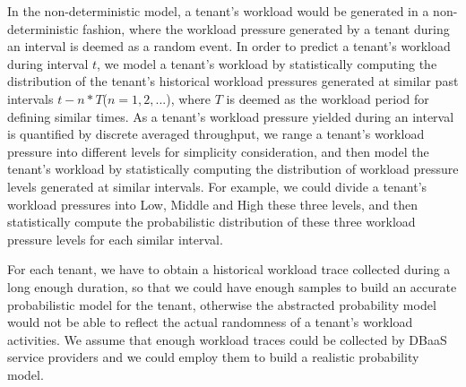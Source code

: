 In the non-deterministic model, a tenant's workload would be generated in a non-deterministic fashion, where the workload pressure generated by a tenant during an interval is deemed as a random event. In order to predict a tenant's workload during interval $t$, we model a tenant's workload by statistically computing the distribution of the tenant's historical workload pressures generated at similar past intervals $t - n*T$($n=1,2,...$), where $T$ is deemed as the workload period for defining similar times. As a tenant's workload pressure yielded during an interval is quantified by discrete averaged throughput, we range a tenant's workload pressure into different levels for simplicity consideration, and then model the tenant's workload by statistically computing the distribution of workload pressure levels generated at similar intervals. For example, we could divide a tenant's workload pressures into Low, Middle and High these three levels, and then statistically compute the probabilistic distribution of these three workload pressure levels for each similar interval.

For each tenant, we have to obtain a historical workload trace collected during a long enough duration, so that we could have enough samples to build an accurate probabilistic model for the tenant, otherwise the abstracted probability model would not be able to reflect the actual randomness of a tenant's workload activities. We assume that enough workload traces could be collected by DBaaS service providers and we could employ them to build a realistic probability model.
